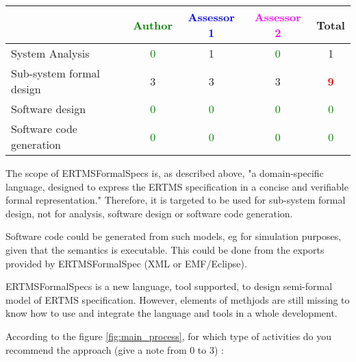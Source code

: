 \begin{tabular}{|l | c | c | c | c|}
\hline
& \textcolor{green}{Author} & \textcolor{blue}{Assessor 1} & \textcolor{magenta}{Assessor 2} & Total \\
\hline 
System Analysis & \textcolor{green}{0} & 1    & \textcolor{green}{0} & 1    \\
\hline
Sub-system formal design & 3    & 3    & 3    & \textcolor{red}{\textbf{9}} \\
\hline
Software design & \textcolor{green}{0} & \textcolor{green}{0} & \textcolor{green}{0} & \textcolor{green}{0} \\
\hline
Software code generation & \textcolor{green}{0} & \textcolor{green}{0} & \textcolor{green}{0} & \textcolor{green}{0} \\
\hline
\end{tabular}

\begin{author_comment}
The scope of ERTMSFormalSpecs is, as described above, "a domain-specific language, designed to express the ERTMS specification in a concise and verifiable formal representation."
Therefore, it is targeted to be used for sub-system formal design, not for analysis, software design or software code generation.
\end{author_comment}

\begin{assessor1}
Software code could be generated from such models, eg for simulation purposes, given that the semantics is executable. This could be done from the exports provided by ERTMSFormalSpec (XML or EMF/Eclipse). 
\end{assessor1}

\begin{assessor2}
ERTMSFormalSpecs is a new language, tool supported, to design semi-formal model of ERTMS specification. However, elements of methjods are still missing to know how to use and integrate the language and tools in a whole development. 
\end{assessor2}

According to the figure \ref{fig:main_process}, for which type of activities do you recommend the approach (give a note from 0 to  3) :

